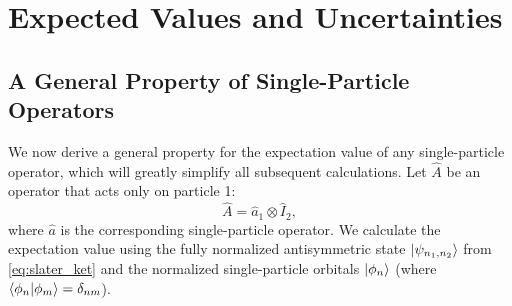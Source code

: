 \section{Expected Values and Uncertainties}

\subsection{A General Property of Single-Particle Operators}

We now derive a general property for the expectation value of any
single-particle operator, which will greatly simplify all
subsequent calculations.
Let $\hat{A}$ be an operator that acts only on particle 1:
\begin{equation}
  \hat{A} = \hat{a}_1 \otimes \hat{I}_2,
\end{equation}
where $\hat{a}$ is the corresponding single-particle operator.
We calculate the expectation value using the fully normalized
antisymmetric state $\ket{\psi_{n_1, n_2}}$ from \cref{eq:slater_ket}
and the normalized single-particle orbitals $\ket{{\phi}_n}$
(where $\braket{{\phi}_n | {\phi}_m} = \delta_{nm}$).


